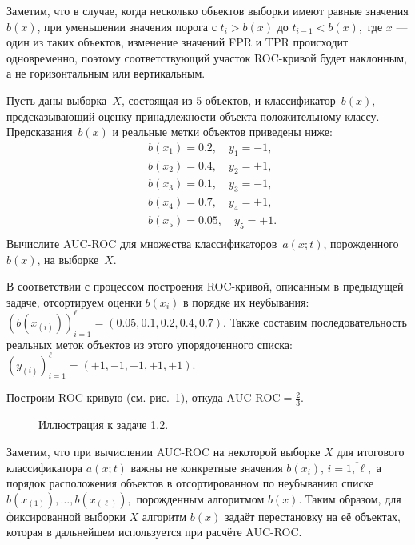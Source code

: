 \documentclass[12pt,a4paper]{article}
\begin{document}
	Заметим, что в случае, когда несколько объектов выборки имеют равные значения $b(x)$, при уменьшении значения порога с $t_i > b(x)$  до $t_{i-1} < b(x),$ где $x$ — один из таких объектов, изменение значений FPR и TPR происходит одновременно, поэтому  соответствующий участок ROC-кривой будет наклонным, а не горизонтальным или вертикальным.
	\begin{vkProblem}
		Пусть даны выборка~$X$, состоящая из 5 объектов, и классификатор~$b(x)$, предсказывающий оценку принадлежности объекта положительному классу. Предсказания~$b(x)$ и реальные метки объектов приведены ниже:
		\begin{align*}
		&b(x_1) = 0.2, \quad  y_1 = -1,\\
		&b(x_2) = 0.4, \quad y_2 = +1,\\
		&b(x_3) = 0.1, \quad y_3 = -1,\\
		&b(x_4) = 0.7, \quad y_4 = +1,\\
		&b(x_5) = 0.05, \quad y_5 = +1.\\
		\end{align*}
		Вычислите AUC-ROC для множества классификаторов~$a(x;t)$, порожденного~$b(x)$, на выборке~$X$.
	\end{vkProblem}
	
	\begin{esSolution}
		В соответствии с процессом построения ROC-кривой, описанным в предыдущей задаче, отсортируем оценки $b(x_i)$ в порядке их неубывания: $(b(x_{(i)}))_{i=1}^\ell = (0.05, 0.1, 0.2, 0.4, 0.7)$. Также составим последовательность реальных меток объектов из этого упорядоченного списка: $(y_{(i)})_{i=1}^\ell = (+1, -1, -1, +1, +1)$.
		
		Построим ROC-кривую (см. рис.~\ref{problem}), откуда $\text{AUC-ROC} = \frac{2}{3}$.
	\end{esSolution}
	\begin{figure}[h]
		\caption{Иллюстрация к задаче 1.2.}
		\label{problem}
	\end{figure}
	
	Заметим, что при вычислении AUC-ROC на некоторой выборке $X$ для итогового классификатора $a(x; t)$ важны не конкретные значения $b(x_i), \, i = \overline{1, \ell},$ а порядок расположения объектов в отсортированном по неубыванию списке $b(x_{(1)}), \dots, b(x_{(\ell)}),$ порожденным алгоритмом $b(x)$. Таким образом, для фиксированной выборки $X$ алгоритм $b(x)$ задаёт перестановку на её объектах, которая в дальнейшем используется при расчёте AUC-ROC.
	
\end{document}
